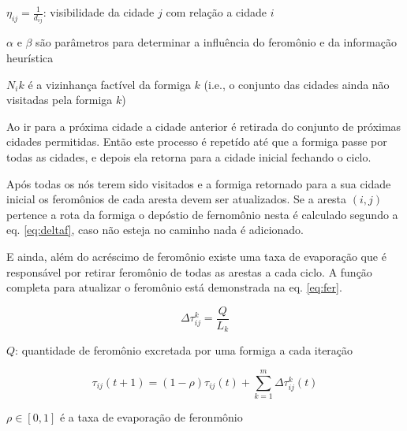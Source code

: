 \documentclass[11pt]{article}
\begin{document}
$\eta_{ij} = \frac{1}{d_{ij}}$: visibilidade da cidade $j$ com relação a cidade $i$

$\alpha$ e $\beta$ são parâmetros para determinar a influência do feromônio e da informação
heurística

$N_{i}{k}$ é a vizinhança factível da formiga $k$ (i.e., o conjunto
das cidades ainda não visitadas pela formiga $k$)

Ao ir para a próxima cidade a cidade anterior é retirada do conjunto de próximas
cidades permitidas. Então este processo é repetído até que a formiga passe por todas
as cidades, e depois ela retorna para a cidade inicial fechando o ciclo.

Após todas os nós terem sido visitados e a formiga retornado para a sua cidade inicial
os feromônios de cada aresta devem ser atualizados. Se a aresta $(i,j)$ pertence
a rota da formiga o depóstio de fernomônio nesta é calculado segundo a eq. \ref{eq:deltaf},
caso não esteja no caminho nada é adicionado.

E ainda, além do acréscimo de feromônio existe uma taxa de evaporação que é responsável
por retirar feromônio de todas as arestas a cada ciclo. A função completa para
atualizar o feromônio está demonstrada na eq. \ref{eq:fer}.

\begin{equation}\label{eq:deltaf}
  \Delta \tau_{ij}^{k} = \frac{Q}{L_{k}}
\end{equation}

 $Q$: quantidade de feromônio excretada por uma formiga a cada iteração

\begin{equation}\label{eq:fer}
  \tau_{ij}(t+1) = (1- \rho)\tau_{ij}(t) + \sum_{k=1}^{m}\Delta \tau_{ij}^{k}(t)
\end{equation}

 $\rho \in [0,1]$ é a taxa de evaporação de feronmônio
\end{document}
